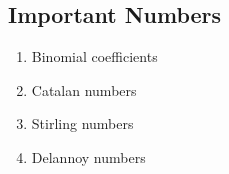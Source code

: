 \documentclass{article}
\begin{document}
\subsection{Important Numbers}
  \begin{enumerate}
    \item Binomial coefficients
    \item Catalan numbers
    \item Stirling numbers
    \item Delannoy numbers
  \end{enumerate}
\end{document}
